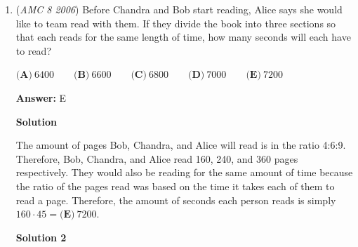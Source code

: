 \begin{enumerate}
 \textbf{Answer: }C



\textbf{Solution 1}

Same as the previous problem, we only use the information we need. Note that it's not just Chandra reads half of it and Bob reads the rest since they have different reading rates. In this case, we set up an equation and solve.

 Let $x$ be the number of pages that Chandra reads.

 $30x = 45(760-x)$ Distribute the $45$
$30x = 45(760) - 45x$ Add $45x$ to both sides

 $75x = 45(760)$ Divide both sides by $15$ to make it easier to solve

 $5x = 3(760)$ Divide both sides by $5$
$x = 3(152) = \boxed{\textbf{(C)} 456}$




\textbf{Solution 2 (a bit faster)}

Chandra and Bob read at a rate of $30:45$ seconds per page, respectively. Simplifying that gets us Bob reads $2$ pages for every $3$ pages that Chandra reads. Therefore Chandra should read $\frac{3}{2+3}=\frac{3}{5}$ of the book. $\frac{3}{5}\cdot760$=$\boxed{\textbf{(C)} 456}$



	\item (\textit{AMC 8 2006}) Before Chandra and Bob start reading, Alice says she would like to team read with them. If they divide the book into three sections so that each reads for the same length of time, how many seconds will each have to read? 


 $\textbf{(A)}\ 6400\qquad\textbf{(B)}\ 6600\qquad\textbf{(C)}\ 6800\qquad\textbf{(D)}\ 7000\qquad\textbf{(E)}\ 7200$

 \textbf{Answer: }E



\textbf{Solution}

The amount of pages Bob, Chandra, and Alice will read is in the ratio 4:6:9. Therefore, Bob, Chandra, and Alice read 160, 240, and 360 pages respectively. They would also be reading for the same amount of time because the ratio of the pages read was based on the time it takes each of them to read a page. Therefore, the amount of seconds each person reads is simply $160 \cdot 45 = \boxed{\textbf{(E)}\ 7200}$.

 



\textbf{Solution 2}


\end{enumerate}
